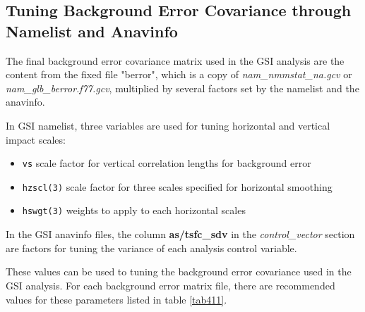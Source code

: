 \subsection{Tuning Background Error Covariance through Namelist and Anavinfo}

The final background error covariance matrix used in the GSI analysis are the content from the fixed file "berror", which is a copy of  \textit{nam\_nmmstat\_na.gcv} or \textit{nam\_glb\_berror.f77.gcv}, multiplied by several factors set by the namelist and the anavinfo.

In GSI namelist, three variables are used for tuning horizontal and vertical impact scales:

\begin{itemize}
\item \verb|vs|	scale factor for vertical correlation lengths for background error
\item \verb|hzscl(3)|	scale factor for three scales specified for horizontal smoothing 
\item \verb|hswgt(3)|	weights to apply to each horizontal scales
\end{itemize}

In the GSI anavinfo files, the column \textbf{as/tsfc\_sdv} in the \textit{control\_vector} section are factors for tuning the variance of each analysis control variable.

These values can be used to tuning the background error covariance used in the GSI analysis. For each background error matrix file, there are recommended values for these parameters listed in table \ref{tab411}.

